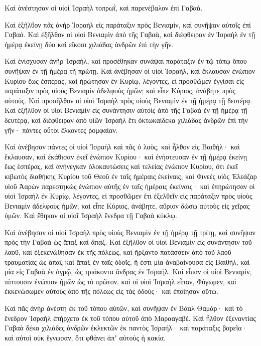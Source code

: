 {Καὶ ἀνέστησαν οἱ υἱοὶ Ἰσραὴλ τοπρωῒ, καὶ παρενέβαλον ἐπὶ Γαβαά.
\par }{\PP {}Καὶ ἐξῆλθον πᾶς ἀνὴρ Ἰσραὴλ εἰς παράταξιν πρὸς Βενιαμὶν, καὶ συνῆψαν αὐτοῖς ἐπὶ Γαβαά.
Καὶ ἐξῆλθον οἱ υἱοὶ Βενιαμὶν ἀπὸ τῆς Γαβαὰ, καὶ διέφθειραν ἐν Ἰσραὴλ ἐν τῇ ἡμέρᾳ ἐκείνῃ δύο καὶ εἴκοσι χιλιάδας ἀνδρῶν ἐπὶ τὴν γῆν.
\par }{\PP {}Καὶ ἐνίσχυσαν ἀνῆρ Ἰσραὴλ, καὶ προσέθηκαν συνάψαι παράταξιν ἐν τῷ τόπῳ ὅπου συνῆψαν ἐν τῇ ἡμέρᾳ τῇ πρώτῃ.
Καὶ ἀνέβησαν οἱ υἱοὶ Ἰσραὴλ, καὶ ἔκλαυσαν ἐνώπιον Κυρίου ἕως ἑσπέρας, καὶ ἠρώτησαν ἐν Κυρίῳ, λέγοντες, εἰ προσθῶμεν ἐγγίσαι εἰς παράταξιν πρὸς υἱοὺς Βενιαμὶν ἀδελφοὺς ἡμῶν; καὶ εἶπε Κύριος, ἀνάβητε πρὸς αὐτούς.
Καὶ προσῆλθον οἱ υἱοὶ Ἰσραὴλ πρὸς υἱοὺς Βενιαμὶν ἐν τῇ ἡμέρᾳ τῇ δευτέρᾳ.
Καὶ ἐξῆλθον οἱ υἱοὶ Βενιαμὶν εἰς συνάντησιν αὐτοὶς ἀπὸ τῆς Γαβαὰ ἐν τῇ ἡμέρᾳ τῇ δευτέρᾳ, καὶ διέφθειραν ἀπὸ υἱῶν Ἰσραὴλ ἔτι ὀκτωκαίδεκα χιλιάδας ἀνδρῶν ἐπὶ τὴν γῆν· πάντες οὗτοι ἕλκοντες ῥομφαίαν.
\par }{\PP {}Καὶ ἀνέβησαν πάντες οἱ υἱοὶ Ἰσραὴλ καὶ πᾶς ὁ λαὸς, καὶ ἦλθον εἰς Βαιθήλ· καὶ ἔκλαυσαν, καὶ ἐκάθισαν ἐκεῖ ἐνώπιον Κυρίου· καὶ ἐνήστευσαν ἐν τῇ ἡμέρᾳ ἐκείνῃ ἕως ἑσπέρας, καὶ ἀνήνεγκαν ὁλοκαυτώσεις καὶ τελείας ἐνώπιον Κυρίου,
ὅτι ἐκεῖ κιβωτὸς διαθήκης Κυρίου τοῦ Θεοῦ ἐν ταῖς ἡμέραις ἐκείναις,
καὶ Φινεὲς υἱὸς Ἐλεάζαρ υἱοῦ Ἀαρὼν παρεστηκὼς ἐνώπιον αὐτῆς ἐν ταῖς ἡμέραις ἐκείναις· καὶ ἐπηρώτησαν οἱ υἱοὶ Ἰσραὴλ ἐν Κυρίῳ, λέγοντες, εἰ προσθῶμεν ἔτι ἐξελθεῖν εἰς παράταξιν πρὸς υἱοὺς Βενιαμὶν ἀδελφοὺς ἡμῶν; καὶ εἶπε Κύριος, ἀνάβητε, αὔριον δώσω αὐτοὺς εἰς χεῖρας ὑμῶν.
Καὶ ἔθηκαν οἱ υἱοῖ Ἰσραὴλ ἔνεδρα τῇ Γαβαὰ κύκλῳ.
\par }{\PP {}Καὶ ἀνέβησαν οἱ υἱοὶ Ἰσραὴλ πρὸς υἱοὺς Βενιαμὶν ἐν τῇ ἡμέρᾳ τῇ τρίτῃ, καὶ συνῆψαν πρὸς τὴν Γαβαὰ ὡς ἅπαξ καὶ ἅπαξ.
Καὶ ἐξῆλθον οἱ υἱοὶ Βενιαμὶν εἰς συνάντησιν τοῦ λαοῦ, καὶ ἐξεκενώθησαν ἐκ τῆς πόλεως, καὶ ἤρξαντο πατάσσειν ἀπὸ τοῦ λαοῦ τραυματίας ὡς ἅπαξ καὶ ἅπαξ ἐν ταῖς ὁδοῖς, ἥ ἐστι μία ἀναβαίνουσα εἰς Βαιθὴλ, καὶ μία εἰς Γαβαὰ ἐν ἀγρῷ, ὡς τριάκοντα ἄνδρας ἐν Ἰσραήλ.
Καὶ εἶπαν οἱ υἱοὶ Βενιαμὶν, πίπτουσιν ἐνώπιον ἡμῶν ὡς τὸ πρῶτον. καὶ οἱ υἱοὶ Ἰσραὴλ εἶπαν, Φύγωμεν, καὶ ἐκκενώσωμεν αὐτοὺς ἀπὸ τῆς πόλεως εἰς τὰς ὁδούς· καὶ ἐποίησαν οὕτω.
\par }{\PP {}Καὶ πᾶς ἀνὴρ ἀνέστη ἐκ τοῦ τόπου αὐτῶν, καὶ συνῆψαν ἐν Βάαλ Θαμάρ· καὶ τὸ ἔνεδρον Ἰσραὴλ ἐπήρχετο ἐκ τοῦ τόπου αὐτοῦ ἀπὸ Μαρααγαβέ.
Καὶ ἦλθον ἐξεναντίας Γαβαὰ δέκα χιλιάδες ἀνδρῶν ἐκλεκτῶν ἐκ παντὸς Ἰσραήλ· καὶ παράταξις βαρεῖα· καὶ αὐτοὶ οὐκ ἔγνωσαν, ὅτι φθάνει ἀπʼ αὐτοὺς ἡ κακία.
}
